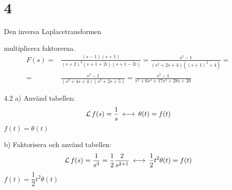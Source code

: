 \chapter{4}{Den inversa Laplacetransformen}

\begin{task}{4.1}
	multiplicera faktorerna.
	\begin{align*}
	F(s)=
	&\frac{(s-1)(s+1)}{(s+2)^2(s+1+2i)(s+1-2i)}=
	\frac{s^2-1}{(s^2+2s+4)((s+1)^2+4)}= \\ =
	&\frac{s^2-1}{(s^2+4s+4)(s^2+2s+5)}=
	\frac{s^2-1}{s^4+6s^3+17s^2+28s+20}
	\end{align*}
\end{task}

\begin{task}{4.2 a)}
	Använd tabellen:
	\[\laplace f(s)=\frac{1}{s}\llra \theta(t)=f(t)\]
	\ans $f(t)=\theta(t)$
\end{task}

\begin{task}{b)}
	Faktorisera och använd tabellen:
	\[\laplace f(s)=\frac{1}{s^3}=\frac{1}{2}\*\frac{2}{s^{2+1}}\llra \frac{1}{2}t^2\theta(t)=f(t)\]
	\ans $f(t)=\dfrac{1}{2}t^2\theta(t)$
\end{task}